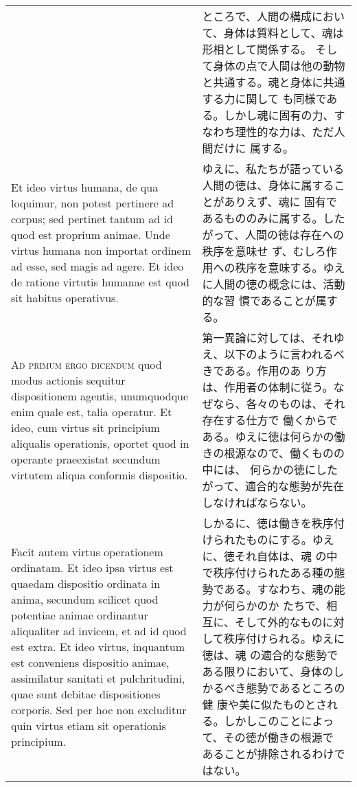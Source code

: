 \documentclass[10pt]{jsarticle}
\begin{document}
\begin{longtable}{p{21em}p{21em}}
&

ところで、人間の構成において、身体は質料として、魂は形相として関係する。
そして身体の点で人間は他の動物と共通する。魂と身体に共通する力に関して
も同様である。しかし魂に固有の力、すなわち理性的な力は、ただ人間だけに
属する。

\\

Et ideo virtus humana, de qua loquimur, non potest pertinere ad
corpus; sed pertinet tantum ad id quod est proprium animae. Unde
virtus humana non importat ordinem ad esse, sed magis ad agere. Et
ideo de ratione virtutis humanae est quod sit habitus operativus.

&

ゆえに、私たちが語っている人間の徳は、身体に属することがありえず、魂に
固有であるもののみに属する。したがって、人間の徳は存在への秩序を意味せ
ず、むしろ作用への秩序を意味する。ゆえに人間の徳の概念には、活動的な習
慣であることが属する。

\\

{\scshape Ad primum ergo dicendum} quod modus actionis sequitur
dispositionem agentis, unumquodque enim quale est, talia operatur. Et
ideo, cum virtus sit principium aliqualis operationis, oportet quod in
operante praeexistat secundum virtutem aliqua conformis
dispositio. 

&

第一異論に対しては、それゆえ、以下のように言われるべきである。作用のあ
り方は、作用者の体制に従う。なぜなら、各々のものは、それ存在する仕方で
働くからである。ゆえに徳は何らかの働きの根源なので、働くものの中には、
何らかの徳にしたがって、適合的な態勢が先在しなければならない。

\\

Facit autem virtus operationem ordinatam.  Et ideo ipsa virtus est
quaedam dispositio ordinata in anima, secundum scilicet quod potentiae
animae ordinantur aliqualiter ad invicem, et ad id quod est extra. Et
ideo virtus, inquantum est conveniens dispositio animae, assimilatur
sanitati et pulchritudini, quae sunt debitae dispositiones
corporis. Sed per hoc non excluditur quin virtus etiam sit operationis
principium.

&

しかるに、徳は働きを秩序付けられたものにする。ゆえに、徳それ自体は、魂
の中で秩序付けられたある種の態勢である。すなわち、魂の能力が何らかのか
たちで、相互に、そして外的なものに対して秩序付けられる。ゆえに徳は、魂
の適合的な態勢である限りにおいて、身体のしかるべき態勢であるところの健
康や美に似たものとされる。しかしこのことによって、その徳が働きの根源で
あることが排除されるわけではない。


\end{longtable}
\end{document}
